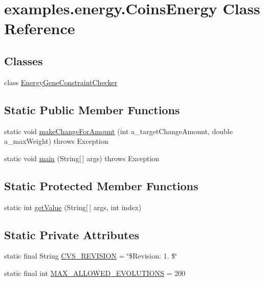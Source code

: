 \hypertarget{classexamples_1_1energy_1_1_coins_energy}{\section{examples.\-energy.\-Coins\-Energy Class Reference}
\label{classexamples_1_1energy_1_1_coins_energy}
}
\subsection*{Classes}
\begin{DoxyCompactItemize}
\item 
class \hyperlink{classexamples_1_1energy_1_1_coins_energy_1_1_energy_gene_constraint_checker}{Energy\-Gene\-Constraint\-Checker}
\end{DoxyCompactItemize}
\subsection*{Static Public Member Functions}
\begin{DoxyCompactItemize}
\item 
static void \hyperlink{classexamples_1_1energy_1_1_coins_energy_ab95e158e011d37a7e988c30ad377fdb9}{make\-Change\-For\-Amount} (int a\-\_\-target\-Change\-Amount, double a\-\_\-max\-Weight)  throws Exception 
\item 
static void \hyperlink{classexamples_1_1energy_1_1_coins_energy_aade3a595fc1223055f6572b6218b072e}{main} (String\mbox{[}$\,$\mbox{]} args)  throws Exception 
\end{DoxyCompactItemize}
\subsection*{Static Protected Member Functions}
\begin{DoxyCompactItemize}
\item 
static int \hyperlink{classexamples_1_1energy_1_1_coins_energy_a9025e5fbc9d109acf260768d17dfefda}{get\-Value} (String\mbox{[}$\,$\mbox{]} args, int index)
\end{DoxyCompactItemize}
\subsection*{Static Private Attributes}
\begin{DoxyCompactItemize}
\item 
static final String \hyperlink{classexamples_1_1energy_1_1_coins_energy_ad964325397305c7bd3de4f0b6cba279c}{C\-V\-S\-\_\-\-R\-E\-V\-I\-S\-I\-O\-N} = \char`\"{}\$Revision\-: 1. \$\char`\"{}
\item 
static final int \hyperlink{classexamples_1_1energy_1_1_coins_energy_a1c4eabfda7d3e4b77309afda15f3057b}{M\-A\-X\-\_\-\-A\-L\-L\-O\-W\-E\-D\-\_\-\-E\-V\-O\-L\-U\-T\-I\-O\-N\-S} = 200
\end{DoxyCompactItemize}


